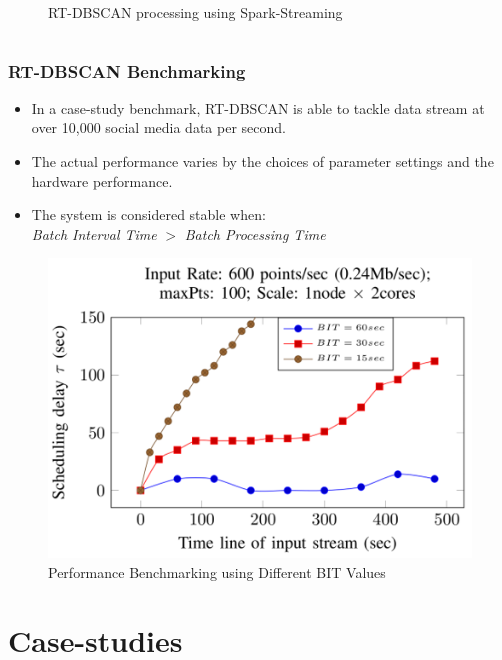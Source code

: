 \begin{frame}
\begin{columns}
\begin{figure}
            \caption{\small RT-DBSCAN processing using Spark-Streaming}
        \end{figure}
    \end{columns}
\end{frame}

\begin{frame}
    \frametitle{RT-DBSCAN Benchmarking}
    \begin{itemize} \small
	    \item  In a case-study benchmark, RT-DBSCAN is able to tackle data stream at over 10,000 social media data per second.
	    \item  The actual performance varies by the choices of parameter settings and the hardware performance.
	    \item The system is considered stable when: \\ {\it Batch Interval Time} $>$  {\it Batch Processing Time}
    \end{itemize}
    \begin{figure}
        \centering
        \includegraphics[width=0.44\linewidth]{resource/figures/rt-dbscan_banchmark.png}
        \vspace{-0.5cm}
        \caption{\small Performance Benchmarking using Different BIT Values}
    \end{figure}
\end{frame}

\section{Case-studies}

